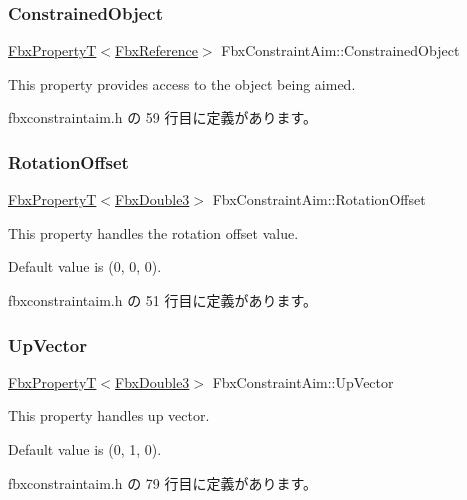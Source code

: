 \subsubsection{\texorpdfstring{Constrained\+Object}{ConstrainedObject}}
{\footnotesize\ttfamily \hyperlink{class_fbx_property_t}{Fbx\+PropertyT}$<$\hyperlink{fbxtypes_8h_a44df6a2eec915cf27cd481e5c5e48a24}{Fbx\+Reference}$>$ Fbx\+Constraint\+Aim\+::\+Constrained\+Object}

This property provides access to the object being aimed. 

 fbxconstraintaim.\+h の 59 行目に定義があります。

\mbox{\label{class_fbx_constraint_aim_a2eff91c699e2dd2391f650a5659f1e5e}} 
\subsubsection{\texorpdfstring{Rotation\+Offset}{RotationOffset}}
{\footnotesize\ttfamily \hyperlink{class_fbx_property_t}{Fbx\+PropertyT}$<$\hyperlink{fbxtypes_8h_ae0a96f14cde566774c7553aa7523b7a7}{Fbx\+Double3}$>$ Fbx\+Constraint\+Aim\+::\+Rotation\+Offset}

This property handles the rotation offset value.

Default value is (0, 0, 0). 

 fbxconstraintaim.\+h の 51 行目に定義があります。

\mbox{\label{class_fbx_constraint_aim_a6c92f45b498fd1f214cde79f84ffc9c7}} 
\subsubsection{\texorpdfstring{Up\+Vector}{UpVector}}
{\footnotesize\ttfamily \hyperlink{class_fbx_property_t}{Fbx\+PropertyT}$<$\hyperlink{fbxtypes_8h_ae0a96f14cde566774c7553aa7523b7a7}{Fbx\+Double3}$>$ Fbx\+Constraint\+Aim\+::\+Up\+Vector}

This property handles up vector.

Default value is (0, 1, 0). 

 fbxconstraintaim.\+h の 79 行目に定義があります。

